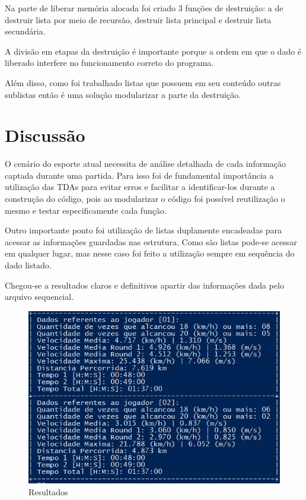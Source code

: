 \documentclass[conference]{IEEEtran}
\begin{document}
Na parte de liberar memória alocada foi criado 3 funções de destruição: a de destruir lista por meio de recursão, destruir lista principal e destruir lista secundária. 

A divisão em etapas da destruição é importante porque a ordem em que o dado é liberado interfere no funcionamento correto do programa.

Além disso, como foi trabalhado listas que possuem em seu conteúdo outras sublistas então é uma solução modularizar a parte da destruição.



\section{Discussão}

O cenário do esporte atual necessita de análise detalhada de cada informação captada durante uma partida. Para isso foi de fundamental importância a utilização das TDAs para evitar erros e facilitar a identificar-los durante a construção do código, pois ao modularizar o código foi possível reutilização o mesmo e testar especificamente cada função.

Outro importante ponto foi utilização de listas duplamente encadeadas para acessar as informações guardadas nas estrutura. Como são listas pode-se acessar em qualquer lugar, mas nesse caso foi feito a utilização sempre em sequência do dado listado.

Chegou-se a resultados claros e definitivos apartir das informações dada pelo arquivo sequencial.

\begin{figure}[htb]
	\caption{\label{Resultado}Resultados}
	\begin{center}
	    \includegraphics[scale=0.4]{figs/teste_csv.jpg}
	\end{center}
\end{figure}
\end{document}
